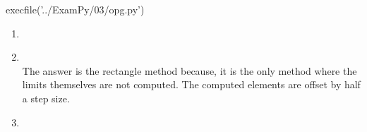 \documentclass[../main.tex]{subfiles}
\begin{document}
\begin{pycode}[03e]
execfile('../ExamPy/03/opg.py')
\end{pycode}

\begin{enumerate}
	\item \\

	\item \\
		The answer is the rectangle method because, it is the only method where the limits themselves
		are not computed. The computed elements are offset by half a step size.
	\item\\
\end{enumerate}
\inputminted{python}{../ExamPy/03/opg.py}

	
\end{document}
